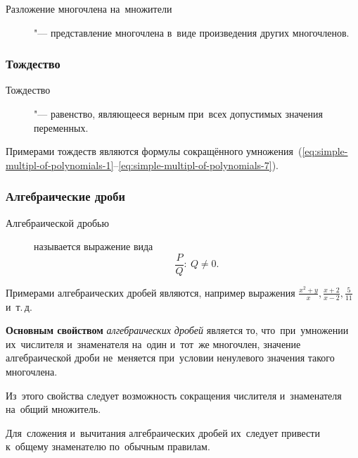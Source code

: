 \documentclass[]{scrartcl}
\begin{document}
\begin{description}
	\item[Разложение многочлена на~множители] "--- представление многочлена в~виде произведения других многочленов.
\end{description}

\subsubsection{Тождество}
\begin{description}
	\item[Тождество] "--- равенство, являющееся верным при~всех допустимых значения переменных.
\end{description}

Примерами тождеств являются формулы сокращённого умножения~(\ref{eq:simple-multipl-of-polynomials-1}--\ref{eq:simple-multipl-of-polynomials-7}).

\subsubsection{Алгебраические дроби}
\begin{description}
	\item[Алгебраической дробью] называется выражение вида
	\begin{equation}\label{eq:alg-frac}
	\frac{P}{Q}:\ Q \neq 0.
	\end{equation} 
\end{description}
Примерами алгебраических дробей являются, например выражения $\frac{x^2+y}{x}, \frac{x+2}{x-2}, \frac{5}{11}$ и~т.\,д.

\textbf{Основным свойством} \emph{алгебраических дробей} является то, что~при~умножении их~числителя и~знаменателя на~один и~тот~же многочлен, значение алгебраической дроби не~меняется при~условии ненулевого значения такого многочлена.

Из~этого свойства следует возможность сокращения числителя и~знаменателя на~общий множитель.

Для~сложения и~вычитания алгебраических дробей их~следует привести к~общему знаменателю по~обычным правилам.
\end{document}
